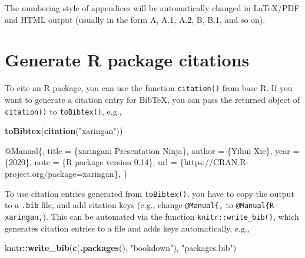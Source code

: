 \documentclass[
  11pt,
]{krantz}
\newenvironment{Shaded}{\begin{snugshade}}{\end{snugshade}}
\newcommand{\DataTypeTok}[1]{\textcolor[rgb]{0.27,0.27,0.27}{#1}}
\newcommand{\KeywordTok}[1]{\textcolor[rgb]{0.27,0.27,0.27}{\textbf{#1}}}
\newcommand{\NormalTok}[1]{#1}
\newcommand{\OperatorTok}[1]{\textcolor[rgb]{0.43,0.43,0.43}{\textbf{#1}}}
\newcommand{\StringTok}[1]{\textcolor[rgb]{0.5,0.5,0.5}{#1}}
\newcommand{\VariableTok}[1]{\textcolor[rgb]{0,0,0}{#1}}
\begin{document}
The numbering style of appendices will be automatically changed in LaTeX/PDF and HTML output (usually in the form A, A.1, A.2, B, B.1, and so on).

\hypertarget{write-bib}{%
\section{Generate R package citations}\label{write-bib}}

To cite an R package, you can use the function \texttt{citation()} from base R. If you want to generate a citation entry for BibTeX, you can pass the returned object of \texttt{citation()} to \texttt{toBibtex()}, e.g.,

\begin{Shaded}
\begin{Highlighting}[]
\KeywordTok{toBibtex}\NormalTok{(}\KeywordTok{citation}\NormalTok{(}\StringTok{"xaringan"}\NormalTok{))}
\end{Highlighting}
\end{Shaded}

\begin{Shaded}
\begin{Highlighting}[]
\VariableTok{@Manual}\NormalTok{\{,}
  \DataTypeTok{title}\NormalTok{ = \{xaringan: Presentation Ninja\},}
  \DataTypeTok{author}\NormalTok{ = \{Yihui Xie\},}
  \DataTypeTok{year}\NormalTok{ = \{2020\},}
  \DataTypeTok{note}\NormalTok{ = \{R package version 0.14\},}
  \DataTypeTok{url}\NormalTok{ = \{https://CRAN.R-project.org/package=xaringan\},}
\NormalTok{\}}
\end{Highlighting}
\end{Shaded}

To use citation entries generated from \texttt{toBibtex()}, you have to copy the output to a \texttt{.bib} file, and add citation keys (e.g., change \texttt{@Manual\{,} to \texttt{@Manual\{R-xaringan,}). This can be automated via the function \texttt{knitr::write\_bib()}, which generates citation entries to a file and adds keys automatically, e.g.,

\begin{Shaded}
\begin{Highlighting}[]
\NormalTok{knitr}\OperatorTok{::}\KeywordTok{write_bib}\NormalTok{(}\KeywordTok{c}\NormalTok{(}\KeywordTok{.packages}\NormalTok{(), }\StringTok{"bookdown"}\NormalTok{), }\StringTok{"packages.bib"}\NormalTok{)}
\end{Highlighting}
\end{Shaded}
\end{document}
